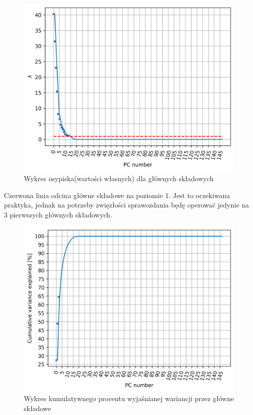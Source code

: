 \documentclass[12pt, a4paper]{article}
\begin{document}
        \begin{figure}[H]
            \centering
            \includegraphics{eigvals.png}
            \caption{Wykres osypiska(wartości własnych) dla głównych składowych}
        \end{figure}
    
        Czerwona linia odcina główne składowe na poziomie 1. Jest to oczekiwana praktyka, jednak na potrzeby zwięzłości sprawozdania
        będę operować jedynie na 3 pierwszych głównych składowych.

        \begin{figure}[H]
            \centering
            \includegraphics{cum_sum.png}
            \caption{Wykres kumulatywnego procentu wyjaśnianej wariancji przez główne składowe}
        \end{figure}
\end{document}
